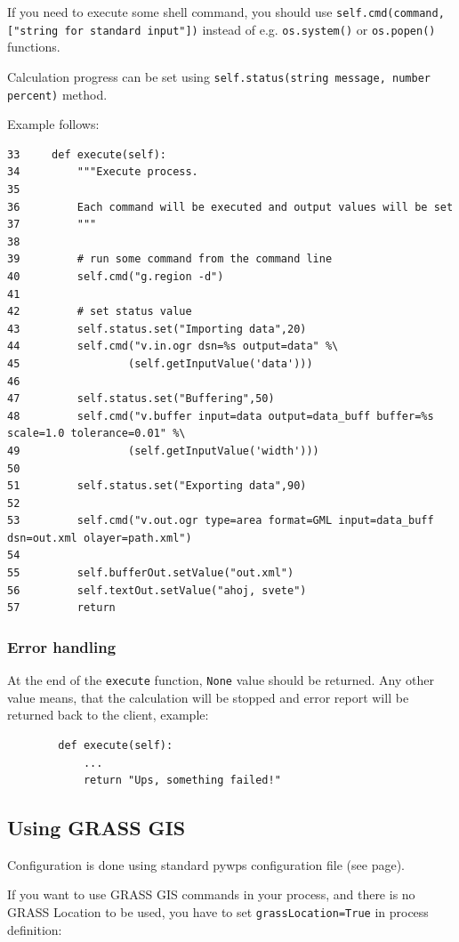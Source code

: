\documentclass[a4paper,11pt]{article}
\begin{document}
If you need to execute some shell command, you should use
\texttt{self.cmd(command,["string for standard input"])} instead of e.g.
\texttt{os.system()} or \texttt{os.popen()} functions.

Calculation progress can be set using \texttt{self.status(string message,
number percent)} method.

Example follows:

\begin{verbatim}
33     def execute(self):
34         """Execute process.
35         
36         Each command will be executed and output values will be set
37         """
38 
39         # run some command from the command line
40         self.cmd("g.region -d")
41 
42         # set status value
43         self.status.set("Importing data",20)
44         self.cmd("v.in.ogr dsn=%s output=data" %\
45                 (self.getInputValue('data')))
46             
47         self.status.set("Buffering",50)
48         self.cmd("v.buffer input=data output=data_buff buffer=%s scale=1.0 tolerance=0.01" %\
49                 (self.getInputValue('width')))
50 
51         self.status.set("Exporting data",90)
52 
53         self.cmd("v.out.ogr type=area format=GML input=data_buff dsn=out.xml olayer=path.xml")
54         
55         self.bufferOut.setValue("out.xml")
56         self.textOut.setValue("ahoj, svete")
57         return
\end{verbatim}

\subsubsection{Error handling}
    
At the end of the \texttt{execute} function, \texttt{None} value should be returned. Any other 
value means, that the calculation will be stopped and error report will be
returned back to the client, example:

\begin{verbatim}
        def execute(self):
            ...
            return "Ups, something failed!"
\end{verbatim}
    

\subsection{Using GRASS GIS}

Configuration is done using standard pywps configuration file (see
page\pageref{configuration}).


If you want to use GRASS GIS commands in your process, and there is no
GRASS Location to be used, you have to set \texttt{grassLocation=True} in
process definition:
\end{document}

